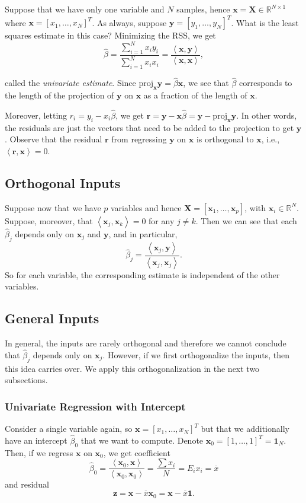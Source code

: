 \documentclass[11pt]{article}
\theoremstyle{definition}
\newcommand{\XX}{\mathbf{X}}
\newcommand{\xx}{\mathbf{x}}
\newcommand{\zz}{\mathbf{z}}
\newcommand{\rr}{\mathbf{r}}
\newcommand{\yy}{\mathbf{y}}
\newcommand{\onevec}{\mathbf{1}}
\newcommand{\ip}[2]{\ensuremath{\left\langle#1, #2\right\rangle}}
\begin{document}
Suppose that we have only one variable and $N$ samples, hence
$\xx=\XX\in\mathbb{R}^{N\times 1}$ where $\xx=[x_1,\ldots,x_N]^T$. As always,
suppose $\yy=[y_1,\ldots,y_N]^T$. What is the least squares estimate in this
case? Minimizing the RSS, we get
\[\hat\beta=\frac{\sum_{i=1}^N x_iy_i}{\sum_{i=1}^N
		x_ix_i}=\frac{\ip\xx\yy}{\ip\xx\xx},\]

called the \emph{univariate estimate}. Since
$\mathrm{proj}_\xx\yy=\hat\beta\xx$, we see that $\hat\beta$ corresponds to the
length of the projection of $\yy$ on $\xx$ as a fraction of the length of $\xx$.

Moreover, letting $r_i=y_i-x_i\hat\beta$, we get
$\rr=\yy-\xx\hat\beta=\yy-\mathrm{proj}_\xx\yy$. In other words, the residuals
are just the vectors that need to be added to the projection to get $\yy$.
Observe that the residual $\rr$ from regressing $\yy$ on $\xx$ is orthogonal to
$\xx$, i.e., $\ip\rr\xx=0$.

\subsection{Orthogonal Inputs}
Suppose now that we have $p$ variables and hence $\XX=[\xx_1,\ldots,\xx_p]$,
with $\xx_i\in\mathbb{R}^N$. Suppose, moreover, that $\ip{\xx_j}{\xx_k}=0$ for
any $j\ne k$. Then we can see that each $\hat\beta_j$ depends only on $\xx_j$
and $\yy$, and in particular,
\[\hat\beta_j=\frac{\ip{\xx_j}\yy}{\ip{\xx_j}{\xx_j}}.\] So for each variable,
the corresponding estimate is independent of the other variables.

\subsection{General Inputs}
In general, the inputs are rarely orthogonal and therefore we cannot conclude
that $\hat\beta_j$ depends only on $\xx_j$. However, if we first orthogonalize
the inputs, then this idea carries over. We apply this orthogonalization in the
next two subsections.

\subsubsection{Univariate Regression with Intercept}
Consider a single variable again, so $\xx=[x_1,\ldots,x_N]^T$ but that we
additionally have an intercept $\hat\beta_0$ that we want to compute. Denote
$\xx_0=[1,\ldots,1]^T=\onevec_N$. Then, if we regress $\xx$ on $\xx_0$, we get
coefficient
\[\hat\beta_0=\frac{\ip{\xx_0}\xx}{\ip{\xx_0}{\xx_0}}=\frac{\sum x_i}{N}=E_ix_i=\overline{x}\]
and residual
\[\zz=\xx-\overline{x}\xx_0=\xx-\overline{x}\onevec.\]
\end{document}
